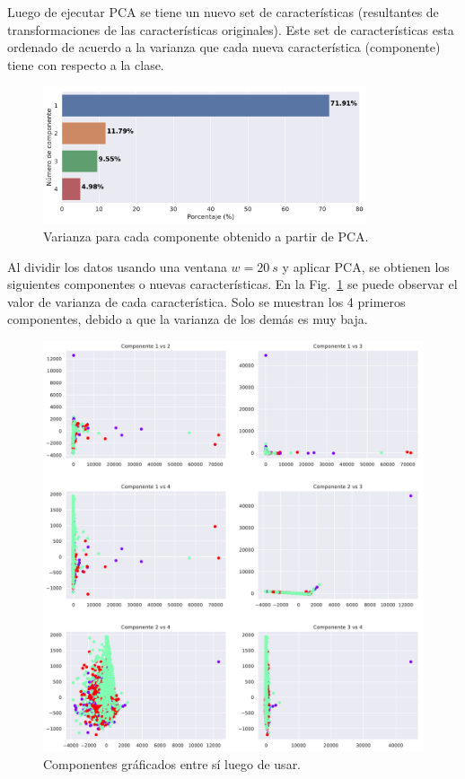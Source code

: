 Luego de ejecutar PCA se tiene un nuevo set de características (resultantes de transformaciones de las características originales). Este set de características esta ordenado de acuerdo a la varianza que cada nueva característica (componente) tiene con respecto a la clase.

\begin{figure}[H]
\centering
\includegraphics[width=0.85\textwidth]{PCA_dist.pdf}
\caption{Varianza para cada componente obtenido a partir de PCA.}
\label{fig:PCA_dist}
\end{figure}

Al dividir los datos usando una ventana $w=\SI{20}{s}$ y aplicar PCA, se obtienen los siguientes componentes o nuevas características. En la Fig.~\ref{fig:PCA_dist} se puede observar el valor de varianza de cada característica. Solo se muestran los 4 primeros componentes, debido a que la varianza de los demás es muy baja.

\begin{figure}[hbt!]
\centering
\includegraphics[width=\textwidth]{PCA_vs.pdf}
\caption{Componentes gráficados entre sí luego de usar.}
\label{fig:PCA_vs}
\end{figure}

